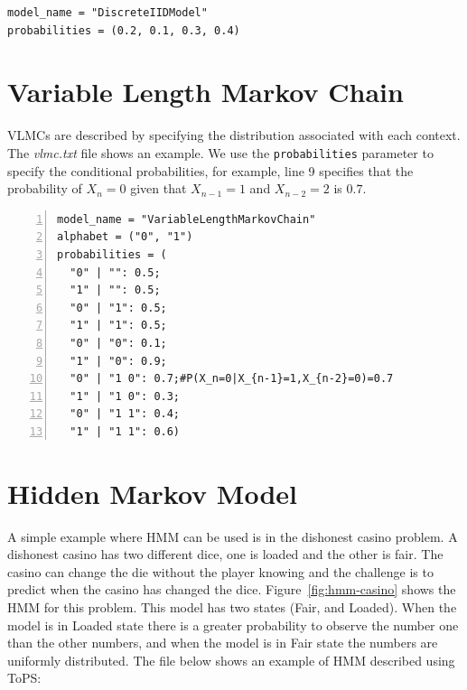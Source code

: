 \begin{Verbatim}[frame=single]
model_name = "DiscreteIIDModel"
probabilities = (0.2, 0.1, 0.3, 0.4)
\end{Verbatim}




\section{Variable Length Markov Chain}

VLMCs are described by specifying  the distribution associated with each context. The  \textit{vlmc.txt} file shows an example. We use the \texttt{probabilities} parameter to specify the conditional probabilities, for example, line 9 specifies that the probability of $X_n = 0$ given that $X_{n-1} = 1$ and $X_{n-2} = 2$ is $0.7$.

\vspace{1em}
\begin{minipage}{\textwidth}
\begin{Verbatim}[frame=single,label={vlmc.txt},numbers=left]
model_name = "VariableLengthMarkovChain"
alphabet = ("0", "1")
probabilities = (
  "0" | "": 0.5; 
  "1" | "": 0.5;
  "0" | "1": 0.5;
  "1" | "1": 0.5;
  "0" | "0": 0.1;
  "1" | "0": 0.9;
  "0" | "1 0": 0.7;#P(X_n=0|X_{n-1}=1,X_{n-2}=0)=0.7
  "1" | "1 0": 0.3; 
  "0" | "1 1": 0.4;
  "1" | "1 1": 0.6)
\end{Verbatim}
\end{minipage}



\section{Hidden Markov Model}

A simple example where HMM can be used is in the dishonest casino problem. A dishonest casino has two different dice, one is loaded and the other is fair. The casino can change the die without the player knowing and the challenge is to predict when the casino has changed the dice.  Figure~\ref{fig:hmm-casino} shows the HMM for this problem.  This model has two states (Fair, and Loaded). When the model is in Loaded state there is a greater probability to observe the number one than the other numbers,  and when the model is in Fair state the numbers are uniformly distributed. The file below shows an example of HMM described using ToPS:


